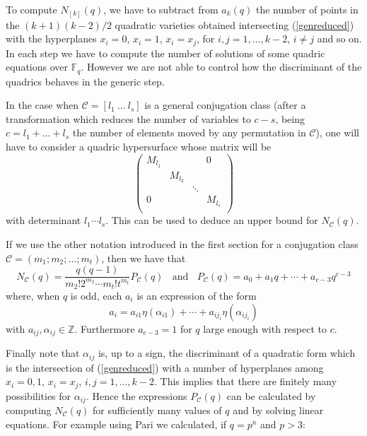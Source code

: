 \documentclass[10pt,a4paper,twoside]{article}
\def\Fq{{\mathbb{F}}_q}
\def\Cl{{\mathcal{C}}}
\begin{document}
To compute $N_{[k]}(q)$, we have to subtract from $a_k(q)$ the number of points in
the $(k+1)(k-2)/2$
quadratic varieties obtained intersecting (\ref{genreduced}) with the
hyperplanes $x_i= 0$,
$x_i=1$, $x_i= x_j$, for $i,j=1,\ldots,k-2$, $i\neq j$ and so on.
In  each step we have to
compute the number of solutions of some quadric equations over $\Fq$.
However we are
not able to control how the discriminant of the quadrics behaves in the generic step.

In the case when $\Cl=[l_1\ \ldots\ l_s]$ is a general conjugation class
(after a transformation which reduces the number of variables to $c-s$, being
$c=l_1+\ldots+l_s$ the number of elements moved by any permutation in $\Cl$),
one will have to consider a quadric hypersurface whose matrix will be
\begin{equation}\label{finsper}\left(
\begin{array}{cccc}
 M_{l_1} &         &        &    0    \\
         & M_{l_2} &        &         \\
         &         & \ddots &         \\
    0    &         &        & M_{l_s} \\
\end{array}\right)
\end{equation}
with determinant $l_1\cdots l_s$. This can be used to deduce
an upper bound for $N_{\Cl}(q)$.

If we use the other notation introduced in the first section for a
conjugation class $\Cl=(m_1;m_2;\ldots;m_t)$, then we have that
$$N_{\Cl}(q)=\frac{q(q-1)}{m_2!2^{m_2}\cdots m_t!t^{m_t}}P_\Cl(q)
\ \ \ \ \textrm{and}\ \ \ \
P_\Cl(q)=a_0+a_1q+\cdots+a_{c-3}q^{c-3}$$
where, when $q$ is odd, each $a_i$ is an expression of the form
$$a_i=a_{i1}\eta(\alpha_{i1})+\cdots+a_{ij_i}\eta(\alpha_{ij_i})$$
with $a_{ij},\alpha_{ij}\in\mathbb Z$. Furthermore $a_{c-3}=1$ for $q$
large enough with respect to $c$.

Finally note that $\alpha_{ij}$ is, up to a sign, the discriminant
of a quadratic form which is the intersection of  (\ref{genreduced}) with
a number of hyperplanes among $x_i= 0,1$, $x_i= x_j$,
$i,j=1,\ldots,k-2$. This implies that there are finitely many
possibilities for $\alpha_{ij}$. Hence the expressions
$P_{\Cl}(q)$ can be calculated by computing $N_\Cl(q)$
for sufficiently many values of $q$ and by solving linear
equations. For example using Pari \cite{Pari} we calculated,
if $q=p^n$ and $p>3$:
\end{document}
